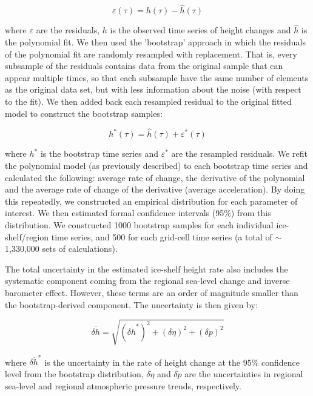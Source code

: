 \begin{equation}
  \varepsilon(\tau) = h(\tau) - \hat h(\tau)
  \label{c2e8}
\end{equation}

\noindent
where $\varepsilon$ are the residuals, $h$ is the observed time series of height changes and $\hat h$ is the polynomial fit. We then used the 'bootstrap' approach \parencite{Efron1993} in which the residuals of the polynomial fit are randomly resampled with replacement. That is, every subsample of the residuals contains data from the original sample that can appear multiple times, so that each subsample have the same number of elements as the original data set, but with less information about the noise (with respect to the fit). We then added back each resampled residual to the original fitted model to construct the bootstrap samples:

\begin{equation}
  h^*(\tau) = \hat h(\tau) + \varepsilon^*(\tau)
  \label{c2e9}
\end{equation}

\noindent
where $h^*$ is the bootstrap time series and $\varepsilon^*$ are the resampled residuals. We refit the polynomial model (as previously described) to each bootstrap time series and calculated the following: average rate of change, the derivative of the polynomial and the average rate of change of the derivative (average acceleration). By doing this repeatedly, we constructed an empirical distribution for each parameter of interest. We then estimated formal confidence intervals (95\%) from this distribution. We constructed 1000 bootstrap samples for each individual ice-shelf/region time series, and 500 for each grid-cell time series (a total of $\sim$1,330,000 sets of calculations).

The total uncertainty in the estimated ice-shelf height rate also includes the systematic component coming from the regional sea-level change and inverse barometer effect. However, these terms are an order of magnitude smaller than the bootstrap-derived component. The uncertainty is then given by:

\begin{equation}
  \delta \dot h = \sqrt{
    (\delta \dot h^*)^2 + (\delta \dot \eta)^2 + (\delta \dot p)^2
    }
  \label{c2e10}
\end{equation}

\noindent
where $\delta \dot h^*$ is the uncertainty in the rate of height change at the 95\% confidence level from the bootstrap distribution, $\delta \dot \eta$ and $\delta \dot p$ are the uncertainties in regional sea-level and regional atmospheric pressure trends, respectively.

